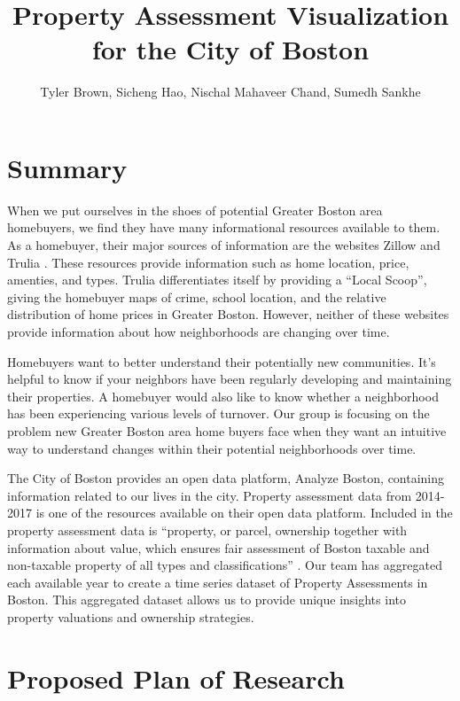\documentclass[12pt]{article}
\title{Property Assessment Visualization for the City of Boston}
\author{Tyler Brown, Sicheng Hao, Nischal Mahaveer Chand, Sumedh Sankhe}
\date{ }
\begin{document}
\maketitle

\section*{Summary}

When we put ourselves in the shoes of potential Greater Boston area
homebuyers, we find they have many informational resources available
to them. As a homebuyer, their major sources of information are the
websites Zillow \cite{ZillowRe12:online} and Trulia
\cite{TruliaRe98:online}. These resources provide information such as
home location, price, amenties, and types. Trulia differentiates itself
by providing a ``Local Scoop'', giving the homebuyer maps of crime, school
location, and the relative distribution of home prices in Greater
Boston. However, neither of these websites provide information about how
neighborhoods are changing over time.

Homebuyers want to better understand their potentially new communities.
It's helpful to know if your neighbors have been regularly developing
and maintaining their properties. A homebuyer would also like to know
whether a neighborhood has been experiencing various levels of turnover.
Our group is focusing on the problem new Greater Boston area home buyers
face when they want an intuitive way to understand changes within their
potential neighborhoods over time.

The City of Boston provides an open data platform, Analyze Boston, 
containing information related to our lives in the city. Property 
assessment data from 2014-2017 is one of the resources available on their
 open data platform. Included in the property assessment data is 
``property, or parcel, ownership together with information about value, 
which ensures fair assessment of Boston taxable and non-taxable property 
of all types and classifications'' \cite{Property49:online}. Our team 
has aggregated each available year to create a time series dataset of 
Property Assessments in Boston. This aggregated dataset allows us to 
provide unique insights into property valuations and ownership strategies.

\section*{Proposed Plan of Research}
\end{document}
